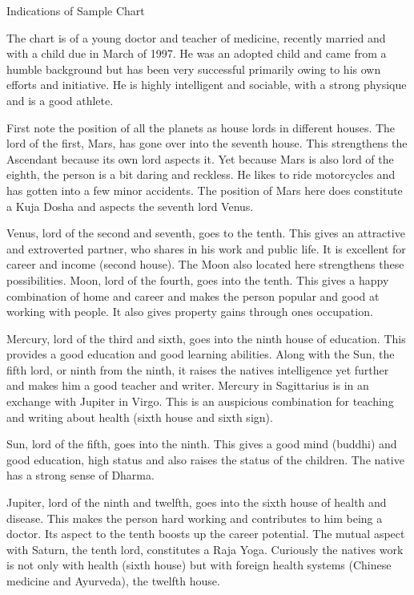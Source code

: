 Indications of Sample Chart

 

The chart is of a young doctor and teacher of medicine, recently married and with a child due in March of 1997. He was an adopted child and came from a humble background but has been very successful primarily owing to his own efforts and initiative. He is highly intelligent and sociable, with a strong physique and is a good athlete.

 

First note the position of all the planets as house lords in different houses. The lord of the first, Mars, has gone over into the seventh house. This strengthens the Ascendant because its own lord aspects it. Yet because Mars is also lord of the eighth, the person is a bit daring and reckless. He likes to ride motorcycles and has gotten into a few minor accidents. The position of Mars here does constitute a Kuja Dosha and aspects the seventh lord Venus.

 

Venus, lord of the second and seventh, goes to the tenth. This gives an attractive and extroverted partner, who shares in his work and public life. It is excellent for career and income (second house). The Moon also located here strengthens these possibilities. Moon, lord of the fourth, goes into the tenth. This gives a happy combination of home and career and makes the person popular and good at working with people. It also gives property gains through ones occupation.

 

Mercury, lord of the third and sixth, goes into the ninth house of education. This provides a good education and good learning abilities. Along with the Sun, the fifth lord, or ninth from the ninth, it raises the natives intelligence yet further and makes him a good teacher and writer. Mercury in Sagittarius is in an exchange with Jupiter in Virgo. This is an auspicious combination for teaching and writing about health (sixth house and sixth sign).

 

Sun, lord of the fifth, goes into the ninth. This gives a good mind (buddhi) and good education, high status and also raises the status of the children. The native has a strong sense of Dharma.

 

Jupiter, lord of the ninth and twelfth, goes into the sixth house of health and disease. This makes the person hard working and contributes to him being a doctor. Its aspect to the tenth boosts up the career potential. The mutual aspect with Saturn, the tenth lord, constitutes a Raja Yoga. Curiously the natives work is not only with health (sixth house) but with foreign health systems (Chinese medicine and Ayurveda), the twelfth house.

